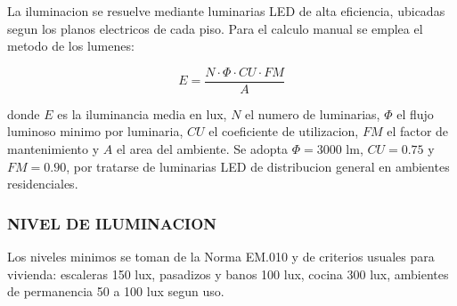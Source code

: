 La iluminacion se resuelve mediante luminarias LED de alta eficiencia, ubicadas segun los planos electricos de cada piso. Para el calculo manual se emplea el metodo de los lumenes:

\[
E = \frac{N \cdot \Phi \cdot CU \cdot FM}{A}
\]

donde \(E\) es la iluminancia media en lux, \(N\) el numero de luminarias, \(\Phi\) el flujo luminoso minimo por luminaria, \(CU\) el coeficiente de utilizacion, \(FM\) el factor de mantenimiento y \(A\) el area del ambiente. Se adopta \(\Phi = 3000\text{ lm}\), \(CU = 0.75\) y \(FM = 0.90\), por tratarse de luminarias LED de distribucion general en ambientes residenciales.

\subsubsection{NIVEL DE ILUMINACION}

Los niveles minimos se toman de la Norma EM.010 y de criterios usuales para vivienda: escaleras 150 lux, pasadizos y banos 100 lux, cocina 300 lux, ambientes de permanencia 50 a 100 lux segun uso.

\begin{table}[H]
\centering
\scriptsize
\caption{Verificacion manual de iluminacion por ambiente}
\end{table}

